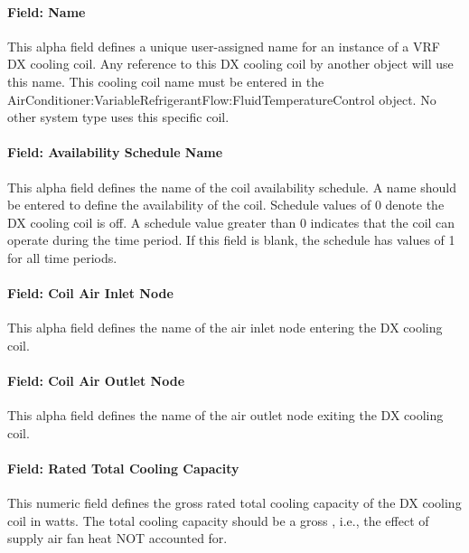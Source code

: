 \paragraph{Field: Name}\label{field-name-7-006}

This alpha field defines a unique user-assigned name for an instance of a VRF DX cooling coil. Any reference to this DX cooling coil by another object will use this name. This cooling coil name must be entered in the AirConditioner:VariableRefrigerantFlow:FluidTemperatureControl object. No other system type uses this specific coil.

\paragraph{Field: Availability Schedule Name}\label{field-availability-schedule-name-3-003}

This alpha field defines the name of the coil availability schedule. A name should be entered to define the availability of the coil. Schedule values of 0 denote the DX cooling coil is off. A schedule value greater than 0 indicates that the coil can operate during the time period. If this field is blank, the schedule has values of 1 for all time periods.

\paragraph{Field: Coil Air Inlet Node}\label{field-coil-air-inlet-node-1}

This alpha field defines the name of the air inlet node entering the DX cooling coil.

\paragraph{Field: Coil Air Outlet Node}\label{field-coil-air-outlet-node-1}

This alpha field defines the name of the air outlet node exiting the DX cooling coil.

\paragraph{Field: Rated Total Cooling Capacity}\label{field-rated-total-cooling-capacity}

This numeric field defines the gross rated total cooling capacity of the DX cooling coil in watts. The total cooling capacity should be a gross , i.e., the effect of supply air fan heat NOT accounted for.

